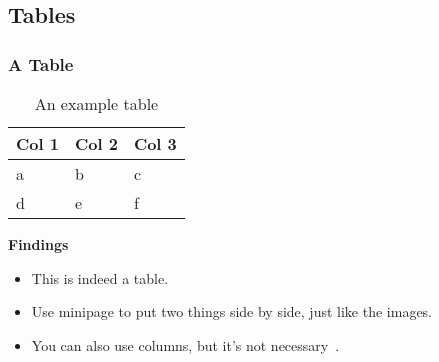 \documentclass[
	10pt, %
	aspectratio=169, %
]{beamer}
\begin{document}
\subsection{Tables}
\begin{frame}
	\frametitle{A Table}
	\centering
	\begin{minipage}{0.3\linewidth}
		\begin{table}
			\centering
			{\small
				\begin{tabular}[c]{lll}
					\toprule
					\textbf{Col 1} & \textbf{Col 2} & \textbf{Col 3} \\ \midrule
					a              & b              & c              \\
					d              & e              & f              \\
					\bottomrule
				\end{tabular}
			}
			\caption{An example table}
			\label{tab:}
		\end{table}
	\end{minipage}
	\begin{minipage}{0.6\linewidth}
		\textbf{Findings}\par
		\begin{itemize}
			\item This is indeed a table.
			\item Use minipage to put two things side by side, just like the images.
			\item You can also use columns, but it's not necessary~\cite{scharrerAnswerMinipageColumns2011}.
		\end{itemize}
	\end{minipage}
\end{frame}
\end{document}
